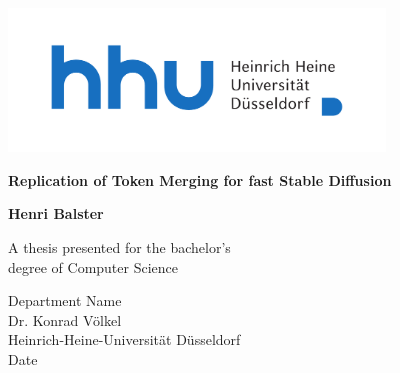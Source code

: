 \begin{titlepage}
    \centering
    \includegraphics[width=10cm]{static/Logo_HHU_+Name_horizontal_4c_+Safezone}\\

    \vspace*{2cm}

    \huge
    \textbf{Replication of Token Merging for fast Stable Diffusion}
    
    \Large
    \vspace{1cm}
    
            
    \vspace{1.5cm}

    \textbf{Henri Balster}

    \large
    \vfill
            
    A thesis presented for the bachelor's\\
    degree of Computer Science
            
    \vspace{0.8cm}
            
    Department Name\\
    Dr. Konrad Völkel\\
    Heinrich-Heine-Universität Düsseldorf\\
    Date
            
\end{titlepage}